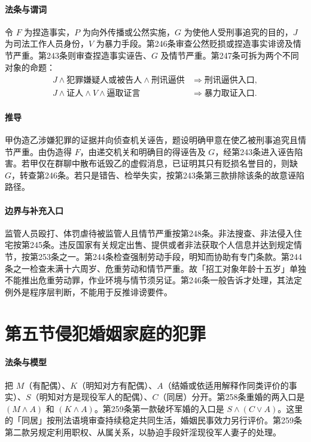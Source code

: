 \paragraph{法条与谓词}
令 $F$ 为捏造事实，$P$ 为向外传播或公然实施，$G$ 为使他人受刑事追究的目的，$J$ 为司法工作人员身份，$V$ 为暴力手段。第246条审查公然贬损或捏造事实诽谤及情节严重。第243条则审查捏造事实诬告、$G$ 及情节严重。第247条可拆为两个不同对象的命题：
\[
\begin{aligned}
 J\land\text{犯罪嫌疑人或被告人}\land\text{刑讯逼供}
   &\Longrightarrow \text{刑讯逼供入口},\\
 J\land\text{证人}\land V\land\text{逼取证言}
   &\Longrightarrow \text{暴力取证入口}.
\end{aligned}
\]

\paragraph{推导}
甲伪造乙涉嫌犯罪的证据并向侦查机关诬告，题设明确甲意在使乙被刑事追究且情节严重。由伪造得 $F$，由递交机关和明确目的得诬告及 $G$，经第243条进入诬告陷害。若甲仅在群聊中散布诋毁乙的虚假消息，已证明其只有贬损名誉目的，则缺 $G$，转查第246条。若只是错告、检举失实，按第243条第三款排除该条的故意诬陷路径。

\paragraph{边界与补充入口}
监管人员殴打、体罚虐待被监管人且情节严重按第248条。非法搜查、非法侵入住宅按第245条。违反国家有关规定出售、提供或者非法获取个人信息并达到规定情节，按第253条之一。第244条检查强制劳动手段，明知而协助有专门条款。第244条之一检查未满十六周岁、危重劳动和情节严重。故「招工对象年龄十五岁」单独不能推出危重劳动罪，作业环境与情节须另证。第246条一般告诉才处理，其法定例外是程序层判断，不能用于反推诽谤要件。

\section{第五节\quad 侵犯婚姻家庭的犯罪}

\paragraph{法条与模型}
把 $M$（有配偶）、$K$（明知对方有配偶）、$A$（结婚或依适用解释作同类评价的事实）、$S$（明知对方是现役军人的配偶）、$C$（同居）分开。第258条重婚的两入口是 $(M\land A)$ 和 $(K\land A)$。第259条第一款破坏军婚的入口是 $S\land(C\lor A)$。这里的「同居」按刑法语境审查持续稳定共同生活，婚姻民事效力另行评价。第259条第二款另规定利用职权、从属关系，以胁迫手段奸淫现役军人妻子的处理。

